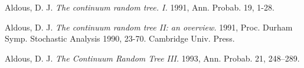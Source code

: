 \documentclass[a4paper,10pt,openright]{report}
\theoremstyle{plain}
\theoremstyle{definition}
\begin{document}
\begin{thebibliography}{99} 

 Aldous, D. J. \textit{The continuum random tree. I.} 1991, Ann. Probab. 19, 1-28.

 Aldous, D. J. \textit{The continuum random tree II: an overview.} 1991, Proc. Durham Symp. Stochastic Analysis 1990, 23-70. Cambridge Univ. Press.

 Aldous, D. J.  \textit{The Continuum Random Tree III.} 1993, Ann. Probab. 21, 248--289.



\end{thebibliography}
\end{document}
